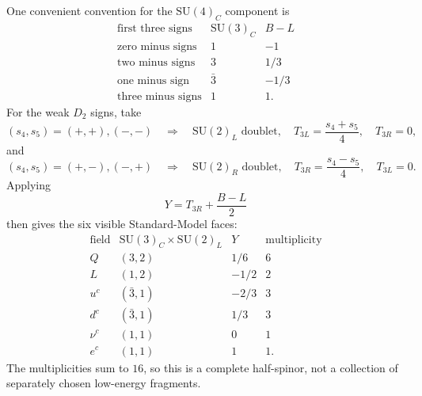 \documentclass[
  aps,
  prd,
  preprint,
  nofootinbib,
  superscriptaddress,
  longbibliography
]{revtex4-2}
\newcommand{\SU}{\mathrm{SU}}
\begin{document}
One convenient convention for the \(\SU(4)_C\) component is
\[
\begin{array}{c|c|c}
\text{first three signs} & \SU(3)_C & B-L\\
\hline
\text{zero minus signs} & 1 & -1\\
\text{two minus signs} & 3 & 1/3\\
\text{one minus sign} & \bar3 & -1/3\\
\text{three minus signs} & 1 & 1 .
\end{array}
\]
For the weak \(D_2\) signs, take
\[
  (s_4,s_5)=(+,+),(-,-)
  \quad\Longrightarrow\quad
  \SU(2)_L\text{ doublet},\quad
  T_{3L}=\frac{s_4+s_5}{4},\quad T_{3R}=0,
\]
and
\[
  (s_4,s_5)=(+,-),(-,+)
  \quad\Longrightarrow\quad
  \SU(2)_R\text{ doublet},\quad
  T_{3R}=\frac{s_4-s_5}{4},\quad T_{3L}=0.
\]
Applying
\[
  Y=T_{3R}+\frac{B-L}{2}
\]
then gives the six visible Standard-Model faces:
\[
\begin{array}{c|c|c|c}
\text{field} & \SU(3)_C\times\SU(2)_L & Y & \text{multiplicity}\\
\hline
Q & (3,2) & 1/6 & 6\\
L & (1,2) & -1/2 & 2\\
u^c & (\bar3,1) & -2/3 & 3\\
d^c & (\bar3,1) & 1/3 & 3\\
\nu^c & (1,1) & 0 & 1\\
e^c & (1,1) & 1 & 1 .
\end{array}
\]
The multiplicities sum to \(16\), so this is a complete half-spinor, not a
collection of separately chosen low-energy fragments.
\end{document}
